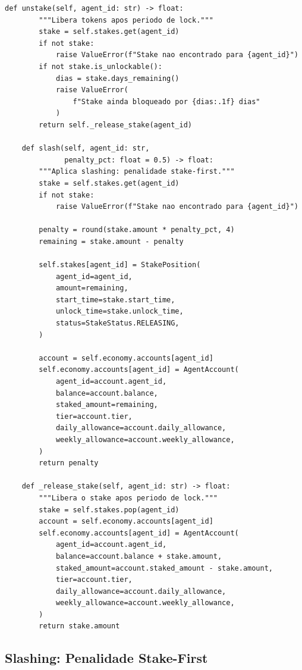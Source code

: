 \begin{lstlisting}[caption={Sistema de staking (SPEC-023)},label={lst:staking}]
    def unstake(self, agent_id: str) -> float:
        """Libera tokens apos periodo de lock."""
        stake = self.stakes.get(agent_id)
        if not stake:
            raise ValueError(f"Stake nao encontrado para {agent_id}")
        if not stake.is_unlockable():
            dias = stake.days_remaining()
            raise ValueError(
                f"Stake ainda bloqueado por {dias:.1f} dias"
            )
        return self._release_stake(agent_id)

    def slash(self, agent_id: str,
              penalty_pct: float = 0.5) -> float:
        """Aplica slashing: penalidade stake-first."""
        stake = self.stakes.get(agent_id)
        if not stake:
            raise ValueError(f"Stake nao encontrado para {agent_id}")

        penalty = round(stake.amount * penalty_pct, 4)
        remaining = stake.amount - penalty

        self.stakes[agent_id] = StakePosition(
            agent_id=agent_id,
            amount=remaining,
            start_time=stake.start_time,
            unlock_time=stake.unlock_time,
            status=StakeStatus.RELEASING,
        )

        account = self.economy.accounts[agent_id]
        self.economy.accounts[agent_id] = AgentAccount(
            agent_id=account.agent_id,
            balance=account.balance,
            staked_amount=remaining,
            tier=account.tier,
            daily_allowance=account.daily_allowance,
            weekly_allowance=account.weekly_allowance,
        )
        return penalty

    def _release_stake(self, agent_id: str) -> float:
        """Libera o stake apos periodo de lock."""
        stake = self.stakes.pop(agent_id)
        account = self.economy.accounts[agent_id]
        self.economy.accounts[agent_id] = AgentAccount(
            agent_id=account.agent_id,
            balance=account.balance + stake.amount,
            staked_amount=account.staked_amount - stake.amount,
            tier=account.tier,
            daily_allowance=account.daily_allowance,
            weekly_allowance=account.weekly_allowance,
        )
        return stake.amount
\end{lstlisting}

\subsection{Slashing: Penalidade Stake-First}

